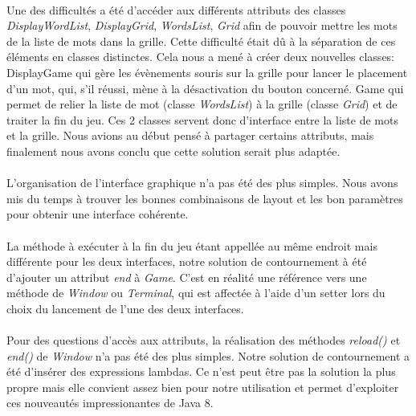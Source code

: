 \documentclass{article}
\begin{document}
\paragraph{} Une des difficultés a été d'accéder aux différents attributs des classes \textit{DisplayWordList}, \textit{DisplayGrid}, \textit{WordsList}, \textit{Grid} afin de pouvoir mettre les mots de la liste de mots dans la grille.
Cette difficulté était dû à la séparation de ces éléments en classes distinctes. Cela nous a mené à créer deux nouvelles classes:
DisplayGame qui gère les évènements souris sur la grille pour lancer le placement d'un mot, qui, s'il réussi, mène à la désactivation du bouton concerné.
Game qui permet de relier la liste de mot (classe \textit{WordsList}) à la grille (classe \textit{Grid}) et de traiter la fin du jeu.
Ces 2 classes servent donc d'interface entre la liste de mots et la grille.
Nous avions au début pensé à partager certains attributs, mais finalement nous avons conclu que cette solution serait plus adaptée.

\paragraph{} L'organisation de l'interface graphique n'a pas été des plus simples. Nous avons mis du temps à trouver les bonnes combinaisons de layout et les bon paramètres pour obtenir une interface cohérente.

\paragraph{} La méthode à exécuter à la fin du jeu étant appellée au même endroit mais différente pour les deux interfaces, notre solution de contournement à été d'ajouter un attribut \textit{end} à \textit{Game}. C'est en réalité une référence vers une méthode de \textit{Window} ou \textit{Terminal}, qui est affectée à l'aide d'un setter lors du choix du lancement de l'une des deux interfaces.

\paragraph{} Pour des questions d'accès aux attributs, la réalisation des méthodes \textit{reload()} et \textit{end()} de \textit{Window} n'a pas été des plus simples. Notre solution de contournement a été d'insérer des expressions lambdas. Ce n'est peut être pas la solution la plus propre mais elle convient assez bien pour notre utilisation et permet d'exploiter ces nouveautés impressionantes de Java 8.
\end{document}
